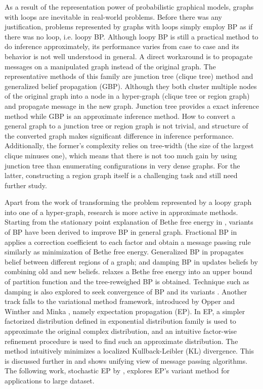 As a result of the representation power of probabilistic graphical models, graphs with loops are inevitable in real-world problems. Before there was any justification, problems represented by graphs with loops simply employ BP as if there was no loop, i.e. loopy BP.  Although loopy BP is still a practical method to do inference approximately, its performance varies from case to case and its behavior is not well understood in general. A direct workaround is to propagate messages on a manipulated graph instead of the original graph. The representative methods of this family are junction tree (clique tree) method \cite[section~10]{koller2009pgm} and generalized belief propagation (GBP)\cite{yedida2005constucting}. Although they both cluster multiple nodes of the original graph into a node in a hyper-graph (clique tree or region graph) and propagate message in the new graph. Junction tree provides a exact inference method while GBP is an approximate inference method. How to convert a general graph to a junction tree or region graph is not trivial, and structure of the converted graph makes significant difference in inference performance. Additionally, the former's complexity relies on tree-width (the size of the largest clique minuses one), which means that there is not too much gain by using junction tree than enumerating configurations in very dense graphs. For the latter, constructing a region graph itself is a challenging task and still need further study.


Apart from the work of transforming the problem represented by a loopy graph into one of a hyper-graph, research is more active in approximate methods. Starting from the stationary point explanation of Bethe free energy in \cite{Yedidia:2000:GBP:3008751.3008848}, variants of BP have been derived to improve BP in general graph. Fractional BP in \cite{Wiegerinck:2002:FBP:2968618.2968673} applies a correction coefficient to each factor and obtain a message passing rule similarly as minimization of Bethe free energy. 
Generalized BP in \cite{Yedidia:2000:GBP:3008751.3008848} propagates belief between different regions of a graph; and damping BP in \cite{Pretti2005damping} updates beliefs by combining old and new beliefs. \cite{wainwright2008graphical} relaxes a Bethe free energy into an upper bound of partition function and the tree-reweighed BP is obtained. Technique such as damping is also explored to seek convergence of BP and its variants \cite{Pretti2005damping}.
Another track falls to the variational method framework, introduced by Opper and Winther \cite{Opper:2000:GPC:1121900.1121911} and Minka \cite{Minka:2001:EPA:647235.720257, Minka:2001:FAA:935427}, namely expectation propagation (EP). In EP, a simpler factorized distribution defined in exponential distribution family is used to approximate the original complex distribution, and an intuitive factor-wise refinement procedure is used to find such an approximate distribution. The method intuitively minimizes a localized Kullback-Leibler (KL) divergence. This is discussed further in \cite{divergence-measures-and-message-passing} and  shows unifying view of message passing algorithms. The following work, stochastic EP by \cite{yingzhen2015sep}, explores EP's variant method for applications to large dataset.

